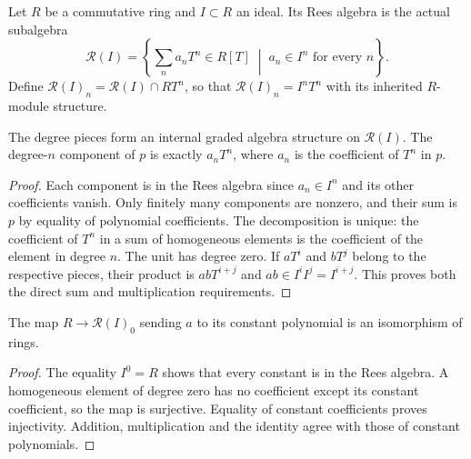 \endgroup

\begingroup

\begin{definition}
\label{def:affine-rees-grading}
\leanok
Let $R$ be a commutative ring and $I\subset R$ an ideal. Its Rees algebra is the actual
subalgebra
\[
\mathcal R(I)=\left\{\sum_n a_nT^n\in R[T]\;\middle|\;a_n\in I^n\text{ for every }n\right\}.
\]
Define $\mathcal R(I)_n=\mathcal R(I)\cap RT^n$, so that
$\mathcal R(I)_n=I^nT^n$ with its inherited $R$-module structure.
\end{definition}

\endgroup

\begingroup

\begin{lemma}
\label{lem:affine-rees-grading}
\leanok
The degree pieces form an internal graded algebra structure on $\mathcal R(I)$.
The degree-$n$ component of $p$ is exactly $a_nT^n$, where $a_n$ is the coefficient
of $T^n$ in $p$.
\end{lemma}
\begin{proof}
Each component is in the Rees algebra since $a_n\in I^n$ and its other coefficients
vanish. Only finitely many components are nonzero, and their sum is $p$ by equality
of polynomial coefficients. The decomposition is unique: the coefficient of $T^n$
in a sum of homogeneous elements is the coefficient of the element in degree $n$.
The unit has degree zero. If $aT^i$ and $bT^j$ belong to the respective pieces,
their product is $abT^{i+j}$ and $ab\in I^iI^j=I^{i+j}$. This proves both the
direct sum and multiplication requirements.
\end{proof}

\endgroup

\begingroup

\begin{lemma}
\label{lem:affine-rees-degree-zero}
\leanok
The map $R\to\mathcal R(I)_0$ sending $a$ to its constant polynomial is an isomorphism
of rings.
\end{lemma}
\begin{proof}
The equality $I^0=R$ shows that every constant is in the Rees algebra. A homogeneous
element of degree zero has no coefficient except its constant coefficient, so
the map is surjective. Equality of constant coefficients proves injectivity.
Addition, multiplication and the identity agree with those of constant polynomials.
\end{proof}

